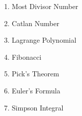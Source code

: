 

\begin{enumerate}
    \normalsize \item Most Divisor Number \par
        \tiny 
    \normalsize \item Catlan Number \par
        \tiny 
    \normalsize \item Lagrange Polynomial \par
        \tiny 
    \normalsize \item Fibonacci \par
        \tiny 
    \normalsize \item Pick's Theorem \par
        \tiny 
    \normalsize \item Euler's Formula \par
        \tiny 
    \normalsize \item Simpson Integral \par
        \tiny 
\end{enumerate}